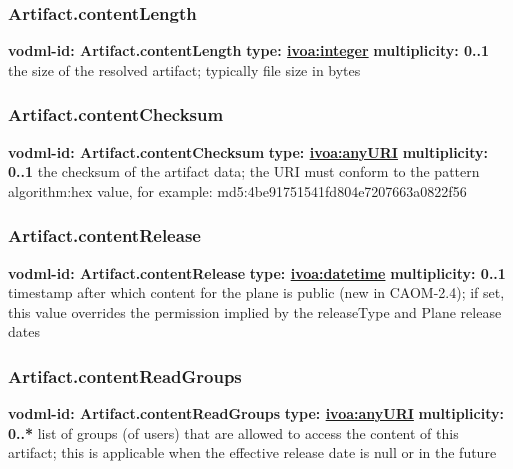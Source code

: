     \subsubsection{Artifact.contentLength}
      \textbf{vodml-id: Artifact.contentLength} \newline
      \textbf{type: \hyperref[sect:ivoa]{ivoa:integer}} \newline
      \textbf{multiplicity: 0..1} \newline
      the size of the resolved artifact; typically file size in bytes

    \subsubsection{Artifact.contentChecksum}
      \textbf{vodml-id: Artifact.contentChecksum} \newline
      \textbf{type: \hyperref[sect:ivoa]{ivoa:anyURI}} \newline
      \textbf{multiplicity: 0..1} \newline
      the checksum of the artifact data; the URI must conform to the pattern {algorithm}:{hex value}, for example: md5:4be91751541fd804e7207663a0822f56

    \subsubsection{Artifact.contentRelease}
      \textbf{vodml-id: Artifact.contentRelease} \newline
      \textbf{type: \hyperref[sect:ivoa]{ivoa:datetime}} \newline
      \textbf{multiplicity: 0..1} \newline
      timestamp after which content for the plane is public (new in CAOM-2.4); if set, this value overrides the permission implied by the releaseType and Plane release dates

    \subsubsection{Artifact.contentReadGroups}
      \textbf{vodml-id: Artifact.contentReadGroups} \newline
      \textbf{type: \hyperref[sect:ivoa]{ivoa:anyURI}} \newline
      \textbf{multiplicity: 0..*} \newline
      list of groups (of users) that are allowed to access the content of this artifact; this is applicable when the effective release date is null or in the future

